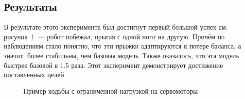\subsection{Результаты}\label{sec:ch5.2/sec5}

В результате этого эксперимента был достигнут первый большой успех см. рисунок~\cref{fig:robot_4.5}~--- робот побежал, прыгая с одной ноги на другую. Причём по наблюдениям стало понятно, что эти прыжки адаптируются к потере баланса, а значит, более стабильны, чем базовая модель. Также оказалось, что эта модель быстрее базовой в 1.5 раза. Этот эксперимент демонстрирует достижение поставленных целей.


\begin{figure}[ht]
    \caption[Пример ходьбы с ограниченной нагрузкой на сервомоторы]{Пример ходьбы с ограниченной нагрузкой на сервомоторы}\label{fig:robot_4.5}
\end{figure}